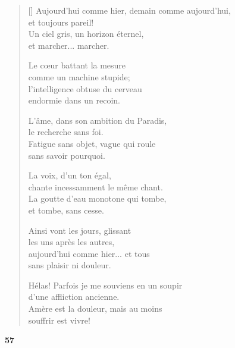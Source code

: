 \documentclass[a4paper,12pt]{book}
\begin{document}
\settowidth{\versewidth}{Aujourd'hui comme hier, demain comme aujourd'hui,}

\begin{verse}[\versewidth]
  Aujourd'hui comme hier, demain comme aujourd'hui, \\
  et toujours pareil! \\
  Un ciel gris, un horizon éternel, \\
  et marcher... marcher.

  Le cœur battant la mesure \\
  comme un machine stupide; \\
  l'intelligence obtuse du cerveau \\
  endormie dans un recoin.

  L'âme, dans son ambition du Paradis, \\
  le recherche sans foi. \\
  Fatigue sans objet, vague qui roule \\
  sans savoir pourquoi.

  La voix, d'un ton égal, \\
  chante incessamment le même chant. \\
  La goutte d'eau monotone qui tombe, \\
  et tombe, sans cesse.

  Ainsi vont les jours, glissant \\
  les uns après les autres, \\
  aujourd'hui comme hier... et tous \\
  sans plaisir ni douleur.

  Hélas! Parfois je me souviens en un soupir \\
  d'une affliction ancienne. \\
  Amère est la douleur, mais au moins \\
  souffrir est vivre!
\end{verse}

\bigskip

\begin{center}
  \textbf{57}
\end{center}

\settowidth{\versewidth}{horribles gravent sur le cœur, si ce n'est au front.}
\end{document}
